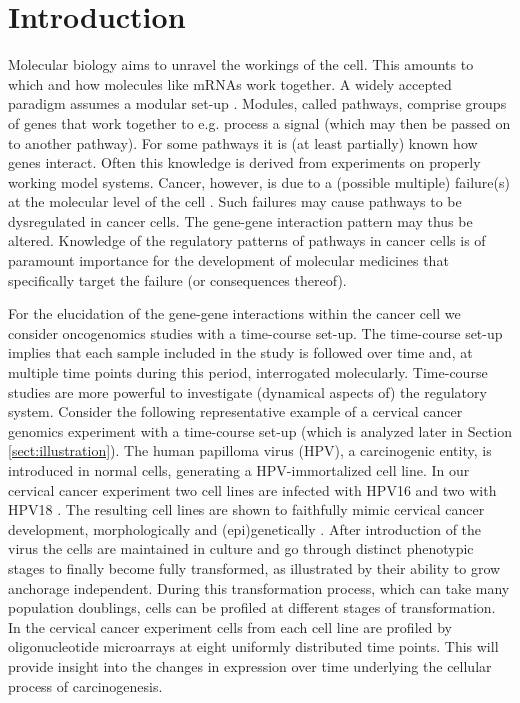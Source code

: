 \section{Introduction}
Molecular biology aims to unravel the workings of the cell. This amounts to which and how molecules like mRNAs work together. A widely accepted paradigm assumes a modular set-up \cite{Alon2003}. Modules, called pathways, comprise groups of genes that work together to e.g. process a signal (which may then be passed on to another pathway). For some pathways it is (at least partially) known how genes interact. Often this knowledge is derived from experiments on properly working model systems. Cancer, however, is due to a (possible multiple) failure(s) at the molecular level of the cell \citep{Weinberg2006}. Such failures may cause pathways to be dysregulated in cancer cells. The gene-gene interaction pattern may thus be altered. Knowledge of the regulatory patterns of pathways in cancer cells is of paramount importance for the development of molecular medicines that specifically target the failure (or consequences thereof).

For the elucidation of the gene-gene interactions within the cancer cell we consider oncogenomics studies with a time-course set-up. The time-course set-up implies that each sample included in the study is followed over time and, at multiple time points during this period, interrogated molecularly. Time-course studies are more powerful to investigate (dynamical aspects of) the regulatory system. Consider the following representative example of a cervical cancer genomics experiment with a time-course set-up (which is analyzed later in Section \ref{sect:illustration}). The human papilloma virus (HPV), a carcinogenic entity, is introduced in normal cells, generating a HPV-immortalized cell line. In our cervical cancer experiment two cell lines are infected with HPV16 and two with HPV18 \cite{Steenbergen1996}. The resulting cell lines are shown to faithfully mimic cervical cancer development, morphologically and (epi)genetically \cite{Steenbergen2004, Wilting2006, Henken2007}. After introduction of the virus the cells are maintained in culture and go through distinct phenotypic stages to finally become fully transformed, as illustrated by their ability to grow anchorage independent. During this transformation process, which can take many population doublings, cells can be profiled at different stages of transformation. In the cervical cancer experiment cells from each cell line are  profiled by oligonucleotide microarrays at eight uniformly distributed time points. This will provide insight into the changes in expression over time underlying the cellular process of carcinogenesis. 


